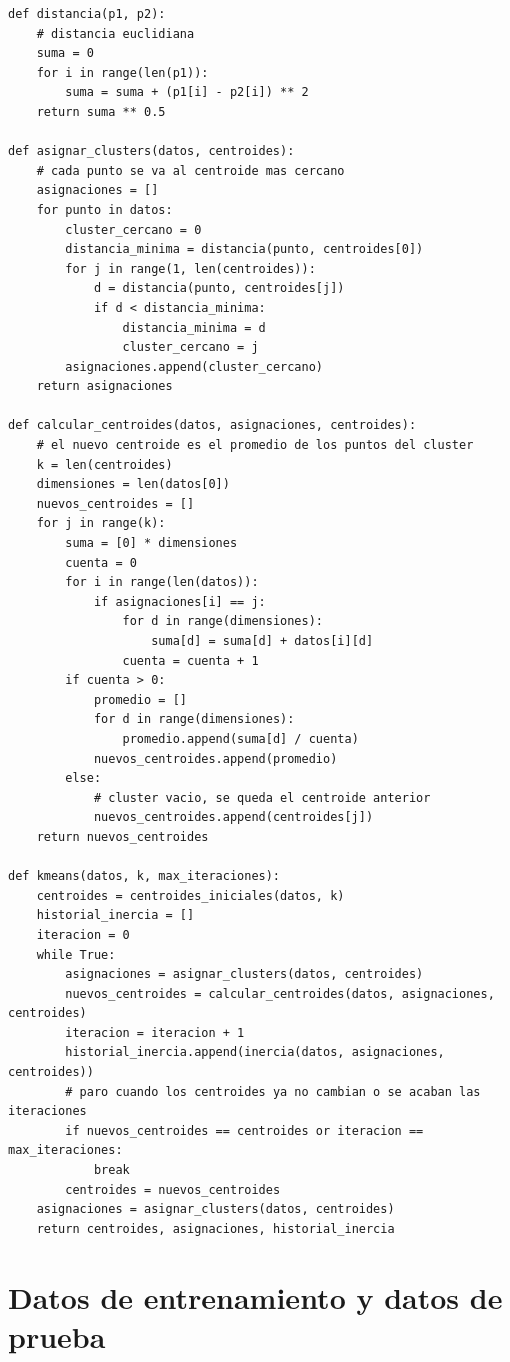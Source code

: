 \documentclass[11pt,a4paper]{article}
\begin{document}
\begin{lstlisting}
def distancia(p1, p2):
    # distancia euclidiana
    suma = 0
    for i in range(len(p1)):
        suma = suma + (p1[i] - p2[i]) ** 2
    return suma ** 0.5

def asignar_clusters(datos, centroides):
    # cada punto se va al centroide mas cercano
    asignaciones = []
    for punto in datos:
        cluster_cercano = 0
        distancia_minima = distancia(punto, centroides[0])
        for j in range(1, len(centroides)):
            d = distancia(punto, centroides[j])
            if d < distancia_minima:
                distancia_minima = d
                cluster_cercano = j
        asignaciones.append(cluster_cercano)
    return asignaciones

def calcular_centroides(datos, asignaciones, centroides):
    # el nuevo centroide es el promedio de los puntos del cluster
    k = len(centroides)
    dimensiones = len(datos[0])
    nuevos_centroides = []
    for j in range(k):
        suma = [0] * dimensiones
        cuenta = 0
        for i in range(len(datos)):
            if asignaciones[i] == j:
                for d in range(dimensiones):
                    suma[d] = suma[d] + datos[i][d]
                cuenta = cuenta + 1
        if cuenta > 0:
            promedio = []
            for d in range(dimensiones):
                promedio.append(suma[d] / cuenta)
            nuevos_centroides.append(promedio)
        else:
            # cluster vacio, se queda el centroide anterior
            nuevos_centroides.append(centroides[j])
    return nuevos_centroides

def kmeans(datos, k, max_iteraciones):
    centroides = centroides_iniciales(datos, k)
    historial_inercia = []
    iteracion = 0
    while True:
        asignaciones = asignar_clusters(datos, centroides)
        nuevos_centroides = calcular_centroides(datos, asignaciones, centroides)
        iteracion = iteracion + 1
        historial_inercia.append(inercia(datos, asignaciones, centroides))
        # paro cuando los centroides ya no cambian o se acaban las iteraciones
        if nuevos_centroides == centroides or iteracion == max_iteraciones:
            break
        centroides = nuevos_centroides
    asignaciones = asignar_clusters(datos, centroides)
    return centroides, asignaciones, historial_inercia
\end{lstlisting}

\section{Datos de entrenamiento y datos de prueba}
\end{document}
